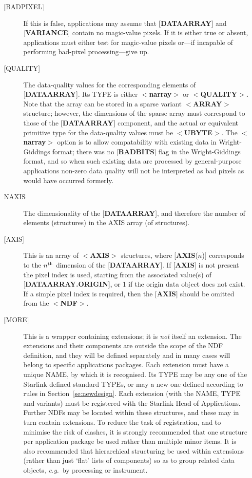 \documentclass[twoside,11pt]{article}
\newcommand{\htmlref}[2]{#1}
\newcommand{\html}[1]{}
\newcommand{\latex}[1]{#1}
\renewcommand{\_}{\texttt{\symbol{95}}}
\begin{document}
\begin{description}
\item [{[}BAD\_PIXEL{]}]  If this
is false, applications may assume that
{[}{\bf DATA\_ARRAY}{]} and {[}{\bf VARIANCE}{]} contain no magic-value
pixels. If it is either true or absent, applications
must either test for magic-value pixels or---if incapable
of performing bad-pixel processing---give up.
\item [{[}QUALITY{]}]  The data-quality values for the
corresponding elements of {[}{\bf DATA\_ARRAY}{]}.
Its TYPE is either $<${\bf narray}$>$ or $<${\bf QUALITY}$>$.
Note that the array can be stored
in a sparse variant \mbox{$<${\bf ARRAY}$>$} structure;
however, the dimensions of the sparse array must correspond to those of the
{[}{\bf DATA\_ARRAY}{]} component, and the actual or equivalent
primitive type for the data-quality values must be $<${\bf \_UBYTE}$>$.
The $<${\bf narray}$>$ option is to allow compatability with existing data in
Wright-Giddings format; there was no
{[}{\bf BADBITS}{]} flag in the Wright-Giddings format,
and so when such existing data are processed by
general-purpose applications
non-zero data quality will not be interpreted as
bad pixels as would have occurred formerly.
\item [NAXIS]  The dimensionality of
the {[}{\bf DATA\_ARRAY}{]}, and therefore
the number of elements (structures) in the AXIS array
(of structures).
\item [{[}AXIS{]}] This is an array of $<${\bf AXIS}$>$ structures, where
{[}{\bf AXIS}($n$){]} corresponds to the $n^{\rm th}$ dimension of the
{[}{\bf DATA\_ARRAY}{]}.
If {[}{\bf AXIS}{]} is not present the pixel index is used, starting
from the associated value(s) of {[}{\bf DATA\_ARRAY.ORIGIN}{]}, or 1 if the
origin data object does not exist. If a simple pixel index is required,
then the {[}{\bf AXIS}{]} should be omitted from the $<${\bf NDF}$>$.
\item [{[}MORE{]}]  This is a wrapper containing extensions; it is {\em
not} itself an extension. The extensions and their components
are outside the scope of the NDF definition, and they will
be defined separately and in many cases will belong
to specific applications packages.
Each extension must have a unique NAME, by which it is recognised.
Its TYPE may be any one of the Starlink-defined standard TYPEs, or
may a new one defined according to rules in
\latex{Section~\ref{se:newdesign}.}\html{\htmlref{Creating New
Structures.}{se:newdesign}}
Each extension (with the NAME, TYPE and variants)
must be registered with the Starlink Head of Applications.
Further NDFs may be located within these structures, and these
may in turn contain extensions.  To reduce the task of registration,
and to minimise the risk of clashes, it is strongly recommended
that one structure per application package be used rather than multiple
minor items. It is also recommended that hierarchical structuring be used
within extensions (rather than just `flat' lists of components)
so as to group related data objects, {\it e.g.}\  by
processing or instrument.
\end{description}
\end{document}
